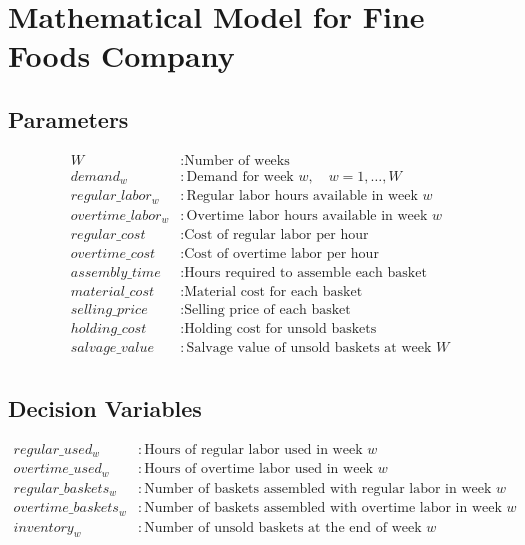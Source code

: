 \documentclass{article}
\begin{document}
\section*{Mathematical Model for Fine Foods Company}

\subsection*{Parameters}
\begin{align*}
W & : \text{Number of weeks} \\
demand_{w} & : \text{Demand for week } w, \quad w = 1, \ldots, W \\
regular\_labor_{w} & : \text{Regular labor hours available in week } w \\
overtime\_labor_{w} & : \text{Overtime labor hours available in week } w \\
regular\_cost & : \text{Cost of regular labor per hour} \\
overtime\_cost & : \text{Cost of overtime labor per hour} \\
assembly\_time & : \text{Hours required to assemble each basket} \\
material\_cost & : \text{Material cost for each basket} \\
selling\_price & : \text{Selling price of each basket} \\
holding\_cost & : \text{Holding cost for unsold baskets} \\
salvage\_value & : \text{Salvage value of unsold baskets at week } W \\
\end{align*}

\subsection*{Decision Variables}
\begin{align*}
regular\_used_{w} & : \text{Hours of regular labor used in week } w \\
overtime\_used_{w} & : \text{Hours of overtime labor used in week } w \\
regular\_baskets_{w} & : \text{Number of baskets assembled with regular labor in week } w \\
overtime\_baskets_{w} & : \text{Number of baskets assembled with overtime labor in week } w \\
inventory_{w} & : \text{Number of unsold baskets at the end of week } w \\
\end{align*}
\end{document}

